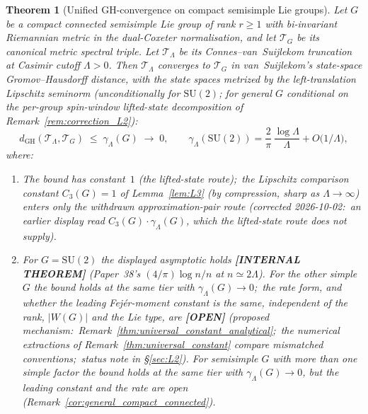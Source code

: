 \documentclass[11pt,a4paper]{article}
\theoremstyle{plain}
\newtheorem{theorem}{Theorem}[section]
\theoremstyle{definition}
\newcommand{\Lammax}{\Lambda}
\newcommand{\Tcal}{\mathcal{T}}
\newcommand{\SU}{\mathrm{SU}}
\begin{document}
\begin{theorem}[Unified GH-convergence on compact semisimple Lie groups]\label{thm:main}
Let $G$ be a compact connected semisimple Lie group of rank $r \ge 1$
with bi-invariant Riemannian metric in the dual-Coxeter normalisation, and
let $\Tcal_G$ be its canonical metric spectral triple. Let
$\Tcal_\Lammax$ be its Connes--van~Suijlekom truncation at Casimir
cutoff $\Lammax > 0$. Then $\Tcal_\Lammax$ converges to $\Tcal_G$ in
van~Suijlekom's state-space Gromov--Hausdorff distance, with the state
spaces metrized by the left-translation Lipschitz seminorm (unconditionally
for $\SU(2)$; for general $G$ conditional on the per-group spin-window
lifted-state decomposition of Remark~\ref{rem:correction_L2}):
\begin{equation}\label{eq:main_thm_general}
   d_{\mathrm{GH}}(\Tcal_\Lammax, \Tcal_G)
   \;\le\; \gamma_\Lammax(G) \;\to\; 0, \qquad
   \gamma_\Lammax(\SU(2)) = \frac{2}{\pi}\,\frac{\log \Lammax}{\Lammax}
   + O\!\bigl(1/\Lammax\bigr),
\end{equation}
where:
\begin{enumerate}\setlength{\itemsep}{2pt}
\item[(i)] The bound has constant~$1$ (the lifted-state route);\ the
Lipschitz comparison constant $C_3(G) = 1$ of Lemma~\ref{lem:L3}
(by compression, sharp as $\Lammax \to \infty$) enters only the withdrawn
approximation-pair route (corrected 2026-10-02:\ an earlier display
read $C_3(G)\cdot\gamma_\Lammax(G)$, which the lifted-state route does
not supply).
\item[(ii)] For $G = \SU(2)$ the displayed asymptotic holds
\textbf{[INTERNAL THEOREM]} (Paper~38's $(4/\pi)\log n/n$ at
$n \simeq 2\Lammax$). For the other simple $G$ the bound holds at the
same tier with $\gamma_\Lammax(G) \to 0$;\ the rate form, and whether
the leading Fej\'er-moment constant is the same, independent of the
rank, $|W(G)|$ and the Lie type, are \textbf{[OPEN]} (proposed mechanism:\
Remark~\ref{thm:universal_constant_analytical};\ the numerical
extractions of Remark~\ref{thm:universal_constant} compare mismatched
conventions;\ status note in \S\ref{sec:L2}).  For semisimple $G$ with more than one simple factor
the bound holds at the same tier with $\gamma_\Lammax(G) \to 0$, but the
leading constant and the rate are open
(Remark~\ref{cor:general_compact_connected}).
\end{enumerate}
\end{theorem}
\end{document}
